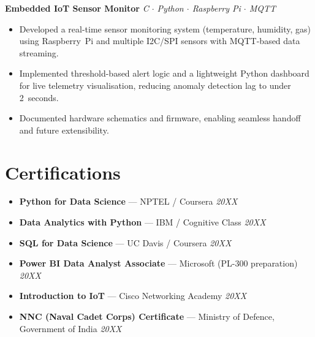 \documentclass[10pt,a4paper]{article}
\newcommand{\projentry}[3]{%
  \noindent\textbf{#1} \hfill \textit{#2}
  \vspace{1pt}#3\vspace{4pt}
}
\begin{document}
\projentry{Embedded IoT Sensor Monitor}{C $\cdot$ Python $\cdot$ Raspberry Pi $\cdot$ MQTT}{
\begin{itemize}
  \item Developed a real-time sensor monitoring system (temperature, humidity, gas) using Raspberry~Pi
        and multiple I2C/SPI sensors with MQTT-based data streaming.
  \item Implemented threshold-based alert logic and a lightweight Python dashboard for live telemetry
        visualisation, reducing anomaly detection lag to under 2~seconds.
  \item Documented hardware schematics and firmware, enabling seamless handoff and future
        extensibility.
\end{itemize}
}

\section{Certifications}
\begin{itemize}
  \item \textbf{Python for Data Science} — NPTEL / Coursera \hfill \textit{20XX} %
  \item \textbf{Data Analytics with Python} — IBM / Cognitive Class \hfill \textit{20XX}
  \item \textbf{SQL for Data Science} — UC Davis / Coursera \hfill \textit{20XX}
  \item \textbf{Power BI Data Analyst Associate} — Microsoft (PL-300 preparation) \hfill \textit{20XX}
  \item \textbf{Introduction to IoT} — Cisco Networking Academy \hfill \textit{20XX}
  \item \textbf{NNC (Naval Cadet Corps) Certificate} — Ministry of Defence, Government of India
        \hfill \textit{20XX}
\end{itemize}

\end{document}
